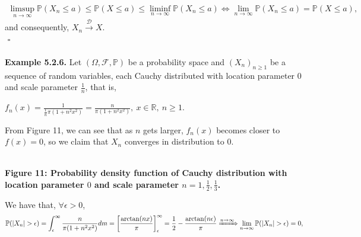 \documentclass{article}
\begin{document}
\begin{eqnarray}
\nonumber
\limsup_{n\to\infty}\mathbb{P}(X_n \leq a) \leq \mathbb{P}(X \leq a) \leq \liminf_{n\to\infty}\mathbb{P}(X_n \leq a) \iff \lim_{n\to\infty}\mathbb{P}(X_n \leq a) = \mathbb{P}(X \leq a),
\end{eqnarray}
and consequently, $X_n \xrightarrow{\mathcal{D}} X$.\\
${}$ \hfill $\square$\\\\
\textbf{Example 5.2.6.} Let $(\Omega,\mathcal{F},\mathbb{P})$ be a probability space and $(X_n)_{n\geq1}$ be a sequence of random variables, each Cauchy distributed with location parameter $0$ and scale parameter $\frac{1}{n}$, that is,
\begin{center}
	$f_n(x) = \frac{1}{\frac{1}{n}\pi(1 + n^2x^2)} = \frac{n}{\pi(1+n^2x^2)}, \ x \in \mathbb{R}, \ n \geq 1$.
\end{center}
From Figure 11, we can see that as $n$ gets larger, $f_n(x)$ becomes closer to $f(x) = 0$, so we claim that $X_n$ converges in distribution to $0$.
\begin{center}
\\
\textbf{Figure 11: Probability density function of Cauchy distribution with location parameter $0$ and scale parameter $n = 1,\frac{1}{2},\frac{1}{3}$.}
\end{center}
We have that, $\forall \epsilon > 0$,
\begin{eqnarray}
\nonumber
\mathbb{P}(|X_n| > \epsilon) = \int_\epsilon^\infty \frac{n}{\pi(1 + n^2x^2)} dm = \left[\frac{\arctan(nx)}{\pi}\right]_{\epsilon}^{\infty} = \frac{1}{2} - \frac{\arctan(n\epsilon)}{\pi} \xRightarrow{n\to\infty} \lim_{n\to\infty}\mathbb{P}(|X_n|>\epsilon) = 0,
\end{eqnarray}
\end{document}
